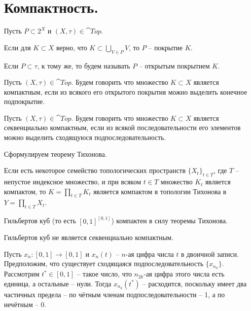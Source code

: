 \chapter{Компактность.}
\begin{definition}
    Пусть $P \subset 2^{X}$ и $(X, \tau) \in \cat{Top}$.

    Если для $K \subset X$ верно, что $K \subset \bigcup_{V \in P} V$, то $P$ -- покрытие $K$.

    Если $P \subset \tau$, к тому же, то будем называть $P$ -- открытым покрытием $K$.
\end{definition}
\begin{definition}
    Пусть $(X, \tau) \in \cat{Top}$.
    Будем говорить что множество $K \subset X$ является компактным, если из всякого его открытого покрытия можно выделить конечное подпокрытие.%
\end{definition}
\begin{definition}
    Пусть $(X, \tau) \in \cat{Top}$. 
    Будем говорить что множество $K \subset X$ является секвенциально компактным, если из всякой последовательности его элементов можно выделить сходящуюся подпоследовательность.%
\end{definition}
Сформулируем теорему Тихонова.
\begin{theorem}[Тихонов]
    Если есть некоторое семейство топологических пространств $\{X_t\}_{t \in T}$, где $T$ -- непустое индексное множество,
    и при всяком $t \in T$ множество $K_t$ является компактом, то $K = \prod_{t \in T} K_t$ является компактом в топологии Тихонова в $Y = \prod_{t \in T} X_t$.
\end{theorem}
\begin{example}
    Гильбертов куб (то есть $[0, 1]^{[0, 1]}$) компактен в силу теоремы Тихонова.
\end{example}
\begin{example}
    Гильбертов куб не является секвенциально компактным.

    Пусть $x_n\colon [0, 1] \to [0, 1]$ и $x_n(t)$ -- $n$-ая цифра числа $t$ в двоичной записи.
    Предположим, что существует сходящаяся подпоследовательность $\{x_{n_k}\}$.
    Рассмотрим $t^* \in [0, 1]$ -- такое число, что $n_{2k}$-ая цифра этого числа есть единица, а остальные -- нули.
    Тогда $x_{n_k}(t^*)$ -- расходится, поскольку имеет два частичных предела -- по чётным членам подпоследовательности -- 1, а по нечётным -- 0.
\end{example}
